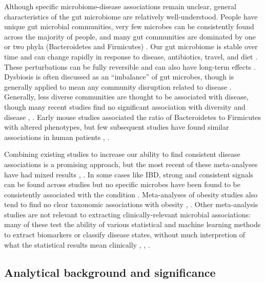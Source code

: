 \documentclass[12pt]{article}
\begin{document}
Although specific microbiome-disease associations remain unclear, general characteristics
of the gut microbiome are relatively well-understood. People have unique gut microbial 
communities, very few microbes can be consistently found across the majority of people,
and many gut communities are dominated by one or two phyla (Bacteroidetes and Firmicutes) \cite{hmp-2012}.
Our gut microbiome is stable over time and can change rapidly in response to 
disease, antibiotics, travel, and diet \cite{david-huge-2012}. These perturbations can be fully reversible
and can also have long-term effects \cite{david-huge-2012}.
Dysbiosis is often discussed as an ``imbalance'' of gut microbes, though
is generally applied to mean any community disruption related to disease \cite{costello-ecology-2012}.
Generally, less diverse communities are thought to be associated with disease,
though many recent studies find no significant association with diversity and disease \cite{walters-ob_meta-2014}, .
Early mouse studies associated the ratio of Bacteroidetes to Firmicutes with
altered phenotypes, but few subsequent studies have found similar associations
in human patients \cite{turnbaugh-energy_harvest-2006}, \cite{sze-signal-2016}. 

Combining existing studies to increase our ability to find consistent
disease associations is a promising approach, but the most recent of these meta-analyses
have had mixed results \cite{walters-ob_meta-2014}, \cite{sze-signal-2016}. 
In some cases like IBD, strong and consistent 
signals can be found across studies but no specific microbes have 
been found to be consistently associated with the condition \cite{walters-ob_meta-2014}. Meta-analyses of obesity studies also tend 
to find no clear taxonomic associations with obesity \cite{sze-signal-2016}, \cite{walters-ob_meta-2014}. 
Other meta-analysis studies are not relevant to extracting 
clinically-relevant microbial associations: many of these test the 
ability of various statistical and machine learning methods
to extract biomarkers or classify disease states, without much
interpretion of what the statistical results mean clinically
\cite{knights-supervised-2010}, \cite{lozupone-meta-2013}, \cite{knights-biomarkers-2011}.

\subsection{Analytical background and significance}
\end{document}
